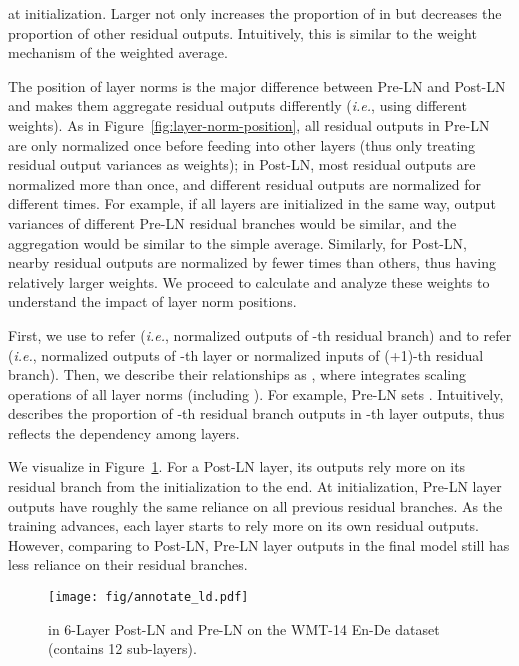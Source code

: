 \documentclass[11pt,a4paper]{article}
\newcommand{\ie}{\textit{i.e.}}
\begin{document}
at initialization. 
Larger  not only increases the proportion of  in  but decreases the proportion of other residual outputs.
Intuitively, this is similar to the weight mechanism of the weighted average.  



The position of layer norms is the major difference between Pre-LN and Post-LN and makes them aggregate residual outputs differently (\ie, using different weights). 
As in Figure~\ref{fig:layer-norm-position}, all residual outputs in Pre-LN are only normalized once before feeding into other layers (thus only treating residual output variances as weights); in Post-LN, most residual outputs are normalized more than once, and different residual outputs are normalized for different times. 
For example, if all layers are initialized in the same way, output variances of different Pre-LN residual branches would be similar, and the aggregation would be similar to the simple average. 
Similarly, for Post-LN, nearby residual outputs are normalized by fewer times than others, thus having relatively larger weights. 
We proceed to calculate and analyze these weights to understand the impact of layer norm positions. 



First, we use  to refer  (\ie, normalized outputs of -th residual branch) and  to refer
 (\ie, normalized outputs of -th layer or normalized inputs of (+1)-th residual branch).
Then, we describe their relationships as , where  integrates scaling operations of all layer norms (including ). 
For example, Pre-LN sets . 
Intuitively,  describes the proportion of -th residual branch outputs in -th layer outputs, thus reflects the dependency among layers.

We visualize  in Figure~\ref{fig:layer-dependency}. 
For a Post-LN layer, its outputs rely more on its residual branch from the initialization to the end.
At initialization, Pre-LN layer outputs have roughly the same reliance on all previous residual branches. 
As the training advances, each layer starts to rely more on its own residual outputs. 
However, comparing to Post-LN, Pre-LN layer outputs in the final model still has less reliance on their residual branches. 

\begin{figure}[t]
\centering
\texttt{[image: fig/annotate\_ld.pdf]}
\caption{
 in 6-Layer Post-LN and Pre-LN on the WMT-14 En-De dataset (contains 12 sub-layers).
}
\label{fig:layer-dependency}
\end{figure}
\end{document}
